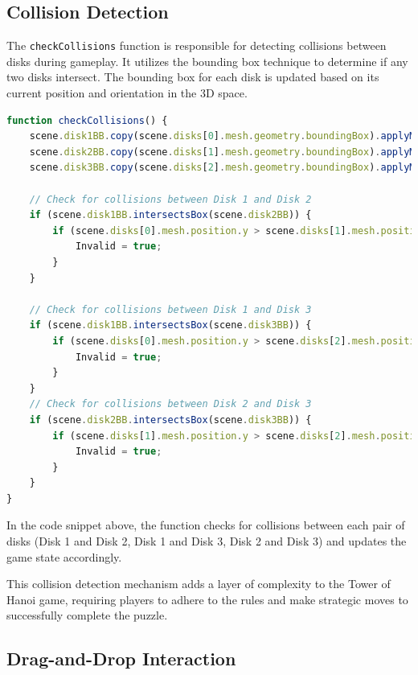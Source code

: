 \documentclass{article}
\begin{document}
\subsection{Collision Detection}

The \texttt{checkCollisions} function is responsible for detecting collisions between disks during gameplay. It utilizes the bounding box technique to determine if any two disks intersect. The bounding box for each disk is updated based on its current position and orientation in the 3D space.

\begin{lstlisting}[language=JavaScript, caption={Collision Detection Function}]
function checkCollisions() {
    scene.disk1BB.copy(scene.disks[0].mesh.geometry.boundingBox).applyMatrix4(scene.disks[0].mesh.matrixWorld);
    scene.disk2BB.copy(scene.disks[1].mesh.geometry.boundingBox).applyMatrix4(scene.disks[1].mesh.matrixWorld);
    scene.disk3BB.copy(scene.disks[2].mesh.geometry.boundingBox).applyMatrix4(scene.disks[2].mesh.matrixWorld);

    // Check for collisions between Disk 1 and Disk 2
    if (scene.disk1BB.intersectsBox(scene.disk2BB)) {
        if (scene.disks[0].mesh.position.y > scene.disks[1].mesh.position.y) {
            Invalid = true;
        }
    }

    // Check for collisions between Disk 1 and Disk 3
    if (scene.disk1BB.intersectsBox(scene.disk3BB)) {
        if (scene.disks[0].mesh.position.y > scene.disks[2].mesh.position.y) {
            Invalid = true;
        }
    }
    // Check for collisions between Disk 2 and Disk 3
    if (scene.disk2BB.intersectsBox(scene.disk3BB)) {
        if (scene.disks[1].mesh.position.y > scene.disks[2].mesh.position.y) {
            Invalid = true;
        }
    }
}
\end{lstlisting}

In the code snippet above, the function checks for collisions between each pair of disks (Disk 1 and Disk 2, Disk 1 and Disk 3, Disk 2 and Disk 3) and updates the game state accordingly.

This collision detection mechanism adds a layer of complexity to the Tower of Hanoi game, requiring players to adhere to the rules and make strategic moves to successfully complete the puzzle.


\subsection{Drag-and-Drop Interaction}
\end{document}
